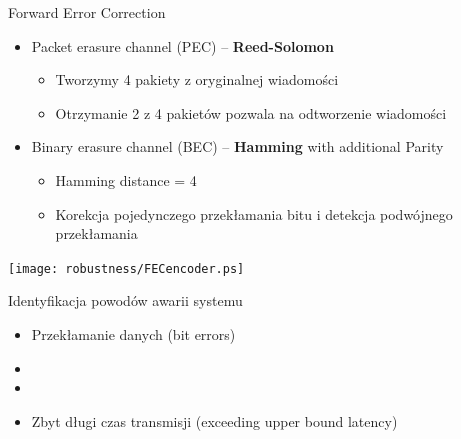 \documentclass[compress,red]{beamer}
\begin{document}
\begin{frame}{Forward Error Correction}

      \begin{itemize}
	\item Packet erasure channel (PEC) -- {\bf Reed-Solomon}
	\begin{itemize}
	  \item Tworzymy 4 pakiety z oryginalnej wiadomości
	  \item Otrzymanie 2 z 4 pakietów pozwala na odtworzenie wiadomości
	\end{itemize}
	\item Binary erasure channel (BEC) -- {\bf Hamming} with additional Parity
	\begin{itemize}
	  \item Hamming distance = 4
	  \item Korekcja pojedynczego przekłamania bitu i detekcja podwójnego przekłamania
	\end{itemize}    
      \end{itemize}


      \begin{center}
      \texttt{[image: robustness/FECencoder.ps]}
      \end{center}

\end{frame}
\begin{frame}{Identyfikacja powodów awarii systemu}


  \begin{itemize}
    \item Przekłamanie danych (bit errors)
    \item  {}
    \item \color{black}{Awaria elementów sieci (element failure)}
    \item Zbyt długi czas transmisji (exceeding upper bound latency)
  \end{itemize}

\end{frame}
\end{document}
